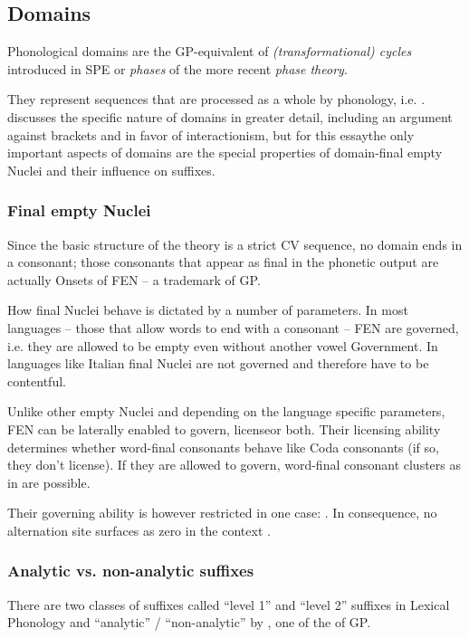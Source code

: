 \subsection{Domains}

Phonological domains are the \gls{GP}-equivalent of
\emph{(transformational) cycles} introduced in SPE \parencite{chomsky1968}
or \emph{phases} of the more recent \emph{phase theory}.

They represent sequences that are processed as a whole by phonology, i.e.
.
\Cite{scheer2012} discusses the specific nature of domains in greater
detail, including an argument against brackets and in favor of
interactionism, but for this essay\co the only important aspects of
domains are the special properties of domain-final empty Nuclei and
their influence on suffixes.


\subsubsection{Final empty Nuclei}
Since the basic structure of the theory is a strict CV sequence,
no domain ends in a consonant; those consonants that appear as final
in the phonetic output are actually Onsets of \gls{FEN}
-- a trademark of \gls{GP}.

How final Nuclei behave is dictated by a number of parameters.
In most languages -- those that allow words to end with a consonant --
\gls{FEN} are governed, i.e. they are allowed to be empty even without
another vowel  Government.
In languages like Italian final Nuclei are not governed and therefore
have to be contentful.

Unlike other empty Nuclei and depending on the language specific parameters,
\gls{FEN} can be laterally enabled to govern, license\co or both.
Their licensing ability determines whether word-final consonants behave
like Coda consonants (if so, they don't license).
If they are allowed to govern, word-final consonant clusters as in 
are possible. \parencite[appendix~1]{scheer2004}

Their governing ability is however restricted in one case:
.
In consequence, no alternation site surfaces as zero in the context
.


\subsubsection{Analytic vs. non-analytic suffixes}
There are two classes of suffixes called \enquote{level 1} and
\enquote{level 2} suffixes in Lexical Phonology and
\enquote{analytic} / \enquote{non-analytic} by ,
one of the  of \gls{GP}.

